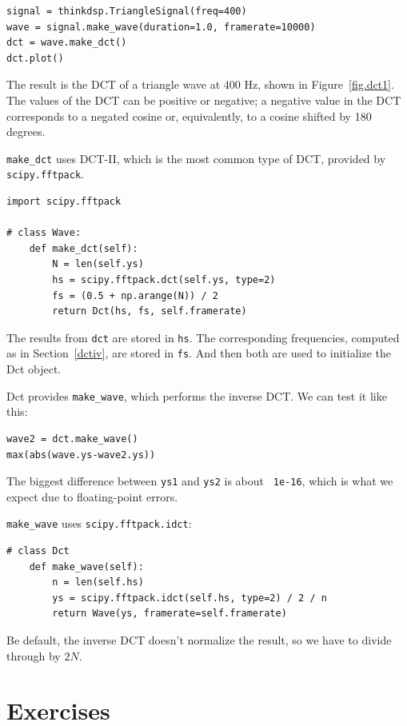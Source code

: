 \documentclass[12pt]{book}
\begin{document}
\begin{verbatim}
signal = thinkdsp.TriangleSignal(freq=400)
wave = signal.make_wave(duration=1.0, framerate=10000)
dct = wave.make_dct()
dct.plot()
\end{verbatim}

The result is the DCT of a triangle wave at 400 Hz, shown in
Figure~\ref{fig.dct1}.  The values of the DCT can be positive or negative;
a negative value in the DCT corresponds to a negated cosine or,
equivalently, to a cosine shifted by 180 degrees.

\verb"make_dct" uses DCT-II, which is the most common type of DCT,
provided by {\tt scipy.fftpack}.

\begin{verbatim}
import scipy.fftpack

# class Wave:
    def make_dct(self):
        N = len(self.ys)
        hs = scipy.fftpack.dct(self.ys, type=2)
        fs = (0.5 + np.arange(N)) / 2
        return Dct(hs, fs, self.framerate)
\end{verbatim}

The results from {\tt dct} are stored in {\tt hs}.  The corresponding
frequencies, computed as in Section~\ref{dctiv}, are stored in {\tt fs}.
And then both are used to initialize the Dct object.

Dct provides \verb"make_wave", which performs the inverse DCT.
We can test it like this:

\begin{verbatim}
wave2 = dct.make_wave()
max(abs(wave.ys-wave2.ys))
\end{verbatim}

The biggest difference between {\tt ys1} and {\tt ys2} is about {\tt
  1e-16}, which is what we expect due to floating-point errors.

\verb"make_wave" uses {\tt scipy.fftpack.idct}:

\begin{verbatim}
# class Dct
    def make_wave(self):
        n = len(self.hs)
        ys = scipy.fftpack.idct(self.hs, type=2) / 2 / n
        return Wave(ys, framerate=self.framerate)
\end{verbatim}

Be default, the inverse DCT doesn't normalize the result, so we have
to divide through by $2N$.


\section{Exercises}
\end{document}
